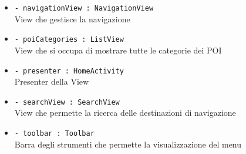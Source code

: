 \documentclass[../DefinizioneDiProdotto.tex]{subfiles}
\begin{document}
\begin{description}
\begin{itemize}
\item \texttt{- navigationView : NavigationView}\\
View che gestisce la navigazione

\item \texttt{- poiCategories : ListView}\\
View che si occupa di mostrare tutte le categorie dei POI

\item \texttt{- presenter : HomeActivity}\\
Presenter della View

\item \texttt{- searchView : SearchView}\\
View che permette la ricerca delle destinazioni di navigazione

\item \texttt{- toolbar : Toolbar}\\
Barra degli strumenti che permette la visualizzazione del menu


\end{itemize}
\end{description}
\end{document}
